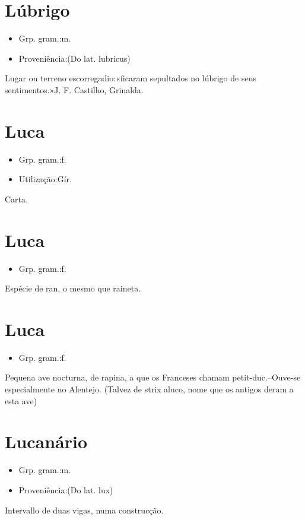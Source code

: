 \section{Lúbrigo}
\begin{itemize}
\item {Grp. gram.:m.}
\end{itemize}
\begin{itemize}
\item {Proveniência:(Do lat. \textunderscore lubricus\textunderscore )}
\end{itemize}
Lugar ou terreno escorregadio:«\textunderscore ficaram sepultados no lúbrigo de seus sentimentos.\textunderscore »J. F. Castilho, \textunderscore Grinalda\textunderscore .
\section{Luca}
\begin{itemize}
\item {Grp. gram.:f.}
\end{itemize}
\begin{itemize}
\item {Utilização:Gír.}
\end{itemize}
Carta.
\section{Luca}
\begin{itemize}
\item {Grp. gram.:f.}
\end{itemize}
Espécie de ran, o mesmo que \textunderscore raineta\textunderscore .
\section{Luca}
\begin{itemize}
\item {Grp. gram.:f.}
\end{itemize}
Pequena ave nocturna, de rapina, a que os Franceses chamam \textunderscore petit-duc\textunderscore .--Ouve-se especialmente no Alentejo.
(Talvez de \textunderscore strix aluco\textunderscore , nome que os antigos deram a esta ave)
\section{Lucanário}
\begin{itemize}
\item {Grp. gram.:m.}
\end{itemize}
\begin{itemize}
\item {Proveniência:(Do lat. \textunderscore lux\textunderscore )}
\end{itemize}
Intervallo de duas vigas, numa construcção.
